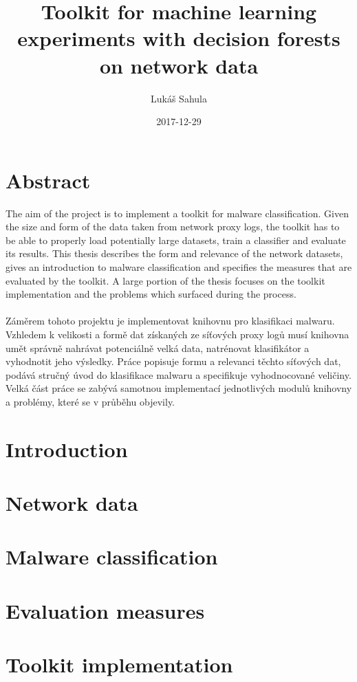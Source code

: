 \documentclass{article}
\title{Toolkit for machine learning experiments with decision forests on network data}
\date{2017-12-29}
\author{Lukáš Sahula}
\begin{document}
  \maketitle
  \newpage
  \section*{Abstract}
    The aim of the project is to implement a toolkit for malware classification. Given the size and form of the data taken from network proxy logs, the toolkit has to be able to properly load potentially large datasets, train a classifier and evaluate its results. This thesis describes the form and relevance of the network datasets, gives an introduction to malware classification and specifies the measures that are evaluated by the toolkit. A large portion of the thesis focuses on the toolkit implementation and the problems which surfaced during the process.
    \\\\Záměrem tohoto projektu je implementovat knihovnu pro klasifikaci malwaru. Vzhledem k velikosti a formě dat získaných ze síťových proxy logů musí knihovna umět správně nahrávat potenciálně velká data, natrénovat klasifikátor a vyhodnotit jeho výsledky. Práce popisuje formu a relevanci těchto síťových dat, podává stručný úvod do klasifikace malwaru a specifikuje vyhodnocované veličiny. Velká část práce se zabývá samotnou implementací jednotlivých modulů knihovny a problémy, které se v průběhu objevily.
  \newpage
  \tableofcontents
  \newpage

  \section*{Introduction}
  \newpage
  \section{Network data}
  \newpage
  \section{Malware classification}
  \newpage
  \section{Evaluation measures}
  \newpage
  \section{Toolkit implementation}
\end{document}
